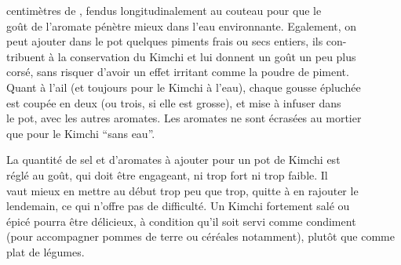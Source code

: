 centimètres de , fendus longitudinalement au couteau pour que le\\
goût de l'aromate pénètre mieux dans l'eau environnante. Egalement, on\\
peut ajouter dans le pot quelques piments frais ou secs entiers, ils con-\\
tribuent à la conservation du Kimchi et lui donnent un goût un peu plus\\
corsé, sans risquer d'avoir un effet irritant comme la poudre de piment.\\
Quant à l'ail (et toujours pour le Kimchi à l'eau), chaque gousse épluchée\\
est coupée en deux (ou trois, si elle est grosse), et mise à infuser dans\\
le pot, avec les autres aromates. Les aromates ne sont écrasées au mortier\\
que pour le Kimchi ``sans eau''.

La quantité de sel et d'aromates à ajouter pour un pot de Kimchi est\\
réglé au goût, qui doit être engageant, ni trop fort ni trop faible. Il\\
vaut mieux en mettre au début trop peu que trop, quitte à en rajouter le\\
lendemain, ce qui n'offre pas de difficulté. Un Kimchi fortement salé ou\\
épicé pourra être délicieux, à condition qu'il soit servi comme condiment\\
(pour accompagner pommes de terre ou céréales notamment), plutôt que comme\\
plat de légumes.

